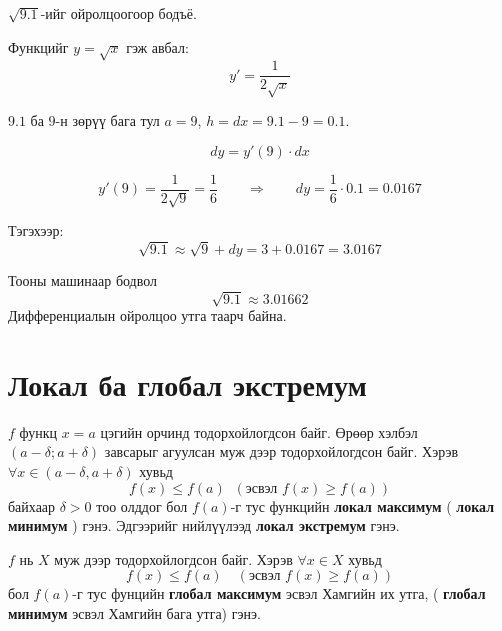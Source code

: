 \begin{example}
$\sqrt{9.1}$-ийг ойролцоогоор бодъё.

Функцийг $y=\sqrt{x}$ гэж авбал:
\[
y' = \frac{1}{2\sqrt{x}}
\]

$9.1$ ба $9$-н зөрүү бага тул $a=9$, $h=dx = 9.1-9 = 0.1$.

\[
dy = y'(9)\cdot dx
\]

\[
y'(9) = \frac{1}{2\sqrt{9}} = \frac{1}{6}
\qquad \Rightarrow \qquad
dy = \frac{1}{6}\cdot 0.1 = 0.0167
\]

Тэгэхээр:
\[
\sqrt{9.1} \approx \sqrt{9}+dy = 3 + 0.0167 = 3.0167
\]

Тооны машинаар бодвол
\[
\sqrt{9.1} \approx 3.01662
\]
Дифференциалын ойролцоо утга таарч байна.
\end{example}
\section{Локал ба глобал экстремум}
\begin{definition}
$f$ функц $x=a$ цэгийн орчинд тодорхойлогдсон байг. Өрөөр хэлбэл $(a-\delta;a+\delta)$ завсарыг агуулсан муж дээр тодорхойлогдсон байг. Хэрэв $\forall x\in(a-\delta,a+\delta)$ хувьд 
\[
f(x)\le f(a)\;\;(\text{эсвэл } f(x)\ge f(a))
\] байхаар $\delta>0$ тоо олддог бол $f(a)$-г тус функцийн \textbf{локал максимум} ( \textbf{локал минимум} ) гэнэ. Эдгээрийг нийлүүлээд \textbf{локал экстремум} гэнэ.
\end{definition}

\begin{definition}
$f$ нь $X$ муж дээр тодорхойлогдсон байг. Хэрэв $\forall x\in X$ хувьд 
\[
f(x)\le f(a)\quad(\text{эсвэл } f(x)\ge f(a))
\]
бол $f(a)$-г  тус фунцийн \textbf{глобал максимум} эсвэл Хамгийн их утга, ( \textbf{глобал минимум} эсвэл Хамгийн бага утга) гэнэ.
\end{definition}

